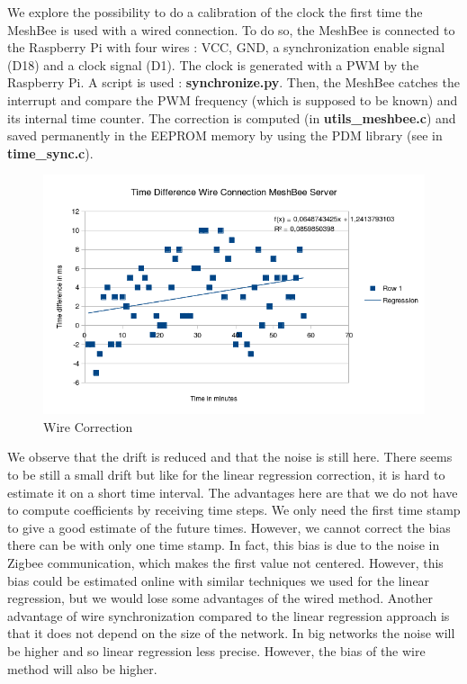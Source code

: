 We explore the possibility to do a calibration of the clock the first time the MeshBee is used with a wired connection. To do so, the MeshBee is connected to the Raspberry Pi with four wires : VCC, GND, a synchronization enable signal (D18) and a clock signal (D1). The clock is generated with a PWM by the Raspberry Pi. A script is used : \textbf{synchronize.py}. Then, the MeshBee catches the interrupt and compare the PWM frequency (which is supposed to be known) and its internal time counter. The correction is computed (in \textbf{utils\_meshbee.c}) and saved permanently in the EEPROM memory by using the PDM library (see in \textbf{time\_sync.c}).

\begin{figure}[ht]
\centering
\includegraphics[width=.6\linewidth]{time_sync_wire_correction_meshbee_server}
\caption[Wire Correction]{\label{f:time_sync_wire_correction_meshbee_server}Wire Correction}
\end{figure}

We observe that the drift is reduced and that the noise is still here. There seems to be still a small drift but like for the linear regression correction, it is hard to estimate it on a short time interval. The advantages here are that we do not have to compute coefficients by receiving time steps. We only need the first time stamp to give a good estimate of the future times. However, we cannot correct the bias there can be with only one time stamp. In fact, this bias is due to the noise in Zigbee communication, which makes the first value not centered. However, this bias could be estimated online with similar techniques we used for the linear regression, but we would lose some advantages of the wired method. Another advantage of wire synchronization compared to the linear regression approach is that it does not depend on the size of the network. In big networks the noise will be higher and so linear regression less precise. However, the bias of the wire method will also be higher.